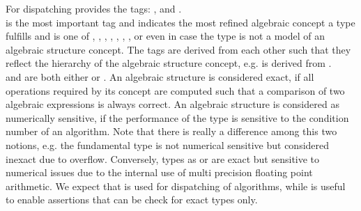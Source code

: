 For dispatching  provides the tags:  
,  and . \\ 
 is the most important tag and indicates the most refined 
algebraic concept a type fulfills and is one of 
, , ,
, , ,
,  or even  
in case the type is not a model of an algebraic structure concept. The tags are derived 
from each other such that they reflect the hierarchy of the algebraic 
structure concept,  e.g.  is derived from . \\

 and  are both either  or .
An algebraic structure is considered exact,
if all operations required by its concept are computed such that a comparison 
of two algebraic expressions is always correct.
An algebraic structure is  considered as numerically sensitive,
if the performance of the type is sensitive to the condition number of an algorithm.
Note that there is really a difference among this two notions, e.g. the fundamental type  
is not numerical sensitive but considered inexact due to overflow. 
Conversely, types as  or  are exact but sensitive 
to numerical issues due to the internal use of multi precision floating point arithmetic.
We expect that  is used for dispatching of algorithms, 
while  is useful to enable assertions that can be check for exact types only.

